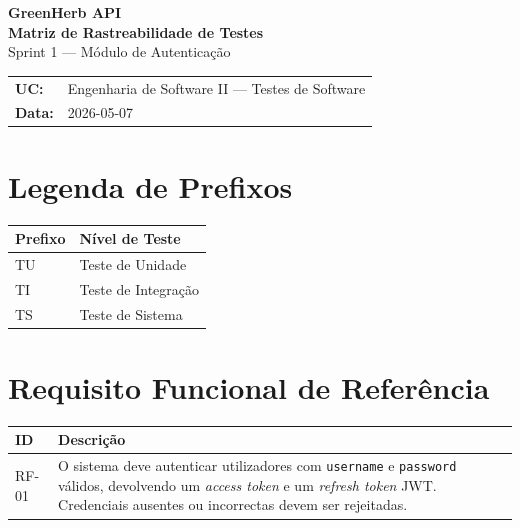 \documentclass[a4paper,11pt]{article}
\begin{document}

\begin{center}
  {\LARGE\bfseries\color{titlecolor} GreenHerb API}\\[6pt]
  {\large\bfseries Matriz de Rastreabilidade de Testes}\\[4pt]
  {\normalsize Sprint 1 — Módulo de Autenticação}\\[12pt]
  \begin{tabular}{@{}ll@{}}
    \textbf{UC:}   & Engenharia de Software II — Testes de Software \\[3pt]
    \textbf{Data:} & 2026-05-07 \\
  \end{tabular}
\end{center}

\vspace{0.4cm}
\tableofcontents
\newpage

\section{Legenda de Prefixos}

\begin{tabular}{@{}C{2cm}L{9cm}@{}}
  \toprule
  \textbf{Prefixo} & \textbf{Nível de Teste} \\
  \midrule
   TU & Teste de Unidade \\
                    TI & Teste de Integração \\
   TS & Teste de Sistema \\
  \bottomrule
\end{tabular}

\section{Requisito Funcional de Referência}

\begin{tabular}{@{}C{1.4cm}L{13cm}@{}}
  \toprule
  \textbf{ID} & \textbf{Descrição} \\
  \midrule
  RF-01 & O sistema deve autenticar utilizadores com \texttt{username} e
          \texttt{password} válidos, devolvendo um \textit{access token} e um
          \textit{refresh token} JWT. Credenciais ausentes ou incorrectas devem
          ser rejeitadas. \\
  \bottomrule
\end{tabular}
\end{document}
